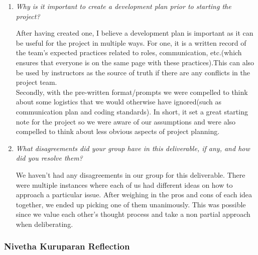 \documentclass{article}
\begin{document}
\begin{enumerate}
  \item \textit{Why is it important to create a development plan
    prior to starting the project?}

    After having created one, I believe a development plan is
    important as it can be useful for the project in multiple ways.
    For one, it is a written record of the team's expected practices
    related to roles, communication, etc.(which ensures that everyone
    is on the same page with these practices).This can also be used
    by instructors as the source of truth if there are any conflicts
    in the project team.\\

    Secondly, with the pre-written format/prompts we were compelled
    to think about some logistics that we would otherwise have
    ignored(such as communication plan and coding standards). In
    short, it set a great starting note for the project so we were
    aware of our assumptions and were also compelled to think about
    less obvious aspects of project planning.

  \item \textit{What disagreements did your group have in this
    deliverable, if any, and how did you resolve them?}

    We haven’t had any disagreements in our group for this
    deliverable. There were multiple instances where each of us had
    different ideas on how to approach a particular issue. After
    weighing in the pros and cons of each idea together, we ended up
    picking one of them unanimously. This was possible since we value
    each other’s thought process and take a non partial approach when
    deliberating.

\end{enumerate}

\subsubsection*{Nivetha Kuruparan Reflection}
\end{document}
